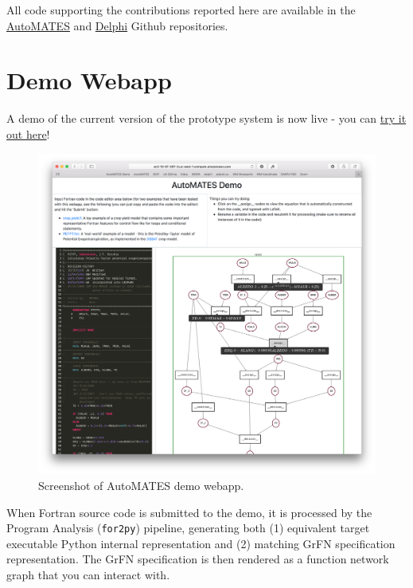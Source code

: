 \documentclass[article, 12pt, oneside]{memoir}
\begin{document}
All code supporting the contributions reported here are available in the
\href{https://github.com/ml4ai/automates}{AutoMATES} and
\href{https://github.com/ml4ai/delphi/}{Delphi} Github repositories.


\hypertarget{demo-webapp}{%
\section{Demo Webapp}\label{demo-webapp}}

A demo of the current version of the prototype system is now live - you
can \href{http://ec2-13-57-207-3.us-west-1.compute.amazonaws.com}{try it
out here}!

\begin{figure}
\centering
\includegraphics{figs/webapp_screenshot.png}
\caption{Screenshot of AutoMATES demo webapp.\label{fig:webapp}}
\end{figure}

When Fortran source code is submitted to the demo, it is processed by
the Program Analysis (\texttt{for2py}) pipeline, generating both (1)
equivalent target executable Python internal representation and (2)
matching GrFN specification representation. The GrFN specification is
then rendered as a function network graph that you can interact with.
\end{document}
